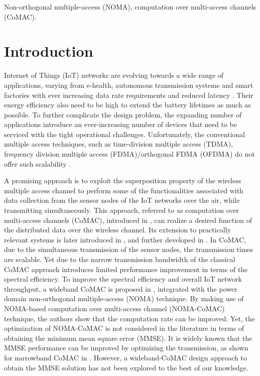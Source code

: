\documentclass[journal]{IEEEtran}
\theoremstyle{definition}
\renewcommand*{\thefootnote}{\fnsymbol{footnote}}
\begin{document}
	\begin{IEEEkeywords}
		Non-orthogonal multiple-access (NOMA), computation over multi-access channels (CoMAC).
	\end{IEEEkeywords}
	
	\section{{Introduction}}
	\renewcommand*{\thefootnote}{\arabic{footnote}}




Internet of Things (IoT) networks are evolving towards a wide range of applications, varying from e-health, autonomous transmission systems and smart factories with ever increasing data rate requirements and reduced latency \cite{ozgun}. Their energy efficiency also need to be high to extend the battery lifetimes as much as possible. To further complicate the design problem, the expanding number of applications introduce an ever-increasing number of devices that need to be serviced with the tight operational challenges. Unfortunately, the conventional multiple access techniques, such as time-division multiple access (TDMA), frequency  division  multiple  access (FDMA)/orthogonal FDMA (OFDMA) do not offer such scalability \cite{goldsmith}. 

A promising approach is to exploit the superposition property of the wireless multiple access channel to perform some of the functionalities associated with data collection from the sensor nodes of the IoT networks over the air, while transmitting simultaneously.  This approach, referred to as computation over multi-access channels (CoMAC), introduced in \cite{nazer}, can realize a desired function of the distributed data over the wireless channel. Its extension to practically relevant systems is later introduced in \cite{goldenbaum}, and further developed in \cite{goldenbaum2}. In CoMAC,  due to the simultaneous transmission of the sensor nodes, the transmission times are scalable. Yet due to the narrow transmission bandwidth of the classical CoMAC approach introduces limited performance improvement in terms of the  spectral efficiency. To improve the spectral efficiency and overall IoT network throughput, a wideband CoMAC is proposed in \cite{wu2020noma}, integrated with the power domain non-orthogonal multiple-access (NOMA) technique. By making use of NOMA-based computation over multi-access channel (NOMA-CoMAC) technique, the authors show that the computation rate can be improved. Yet, the optimization of NOMA-CoMAC is not considered in the literature in terms of obtaining the minimum mean square error (MMSE). It is widely known that the MMSE performance can be improved by optimizing the transmission, as shown for narrowband CoMAC in \cite{semiha}. However, a wideband-CoMAC design approach to obtain the MMSE solution has not been explored to the best of our knowledge.
\end{document}
